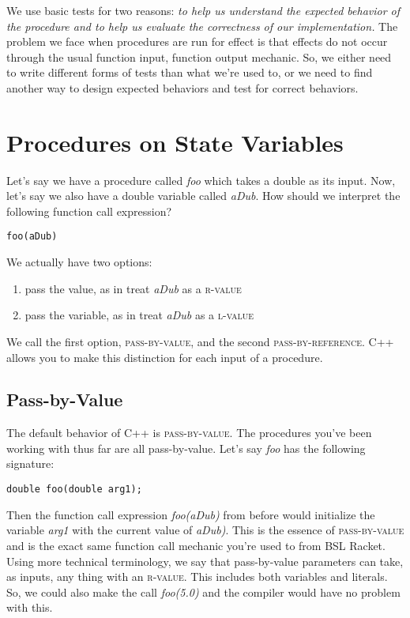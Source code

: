 We use basic tests for two reasons: \textit{to help us understand the expected behavior of the procedure and to help us evaluate the correctness of our implementation.} The problem we face when procedures are run for effect is that effects do not occur through the usual function input, function output mechanic.  So, we either need to write different forms of tests than what we're used to, or we need to find another way to design expected behaviors and test for correct behaviors.

\section{Procedures on State Variables}

Let's say we have a procedure called \textit{foo} which takes a double as its input. Now, let's say we also have a double variable called \textit{aDub}. How should we interpret the following function call expression?
\begin{verbatim}
foo(aDub)
\end{verbatim}
We actually have two options:
\begin{enumerate}
\item pass the value, as in treat \textit{aDub} as a \textsc{r-value}
\item pass the variable, as in treat \textit{aDub} as a \textsc{l-value}
\end{enumerate}
We call the first option, \textsc{pass-by-value}, and the second \textsc{pass-by-reference}.  C++ allows you to make this distinction for each input of a procedure. 

\subsection{Pass-by-Value}

The default behavior of C++ is \textsc{pass-by-value}. The procedures you've been working with thus far are all pass-by-value. Let's say \textit{foo} has the following signature:
\begin{verbatim}
double foo(double arg1);
\end{verbatim} 
Then the function call expression \textit{foo(aDub)} from before would initialize the variable \textit{arg1} with the current value of \textit{aDub)}. This is the essence of \textsc{pass-by-value} and is the exact same function call mechanic you're used to from BSL Racket. Using more technical terminology, we say that pass-by-value parameters can take, as inputs, any thing with an \textsc{r-value}. This includes both variables and literals. So, we could also make the call \textit{foo(5.0)} and the compiler would have no problem with this. 

